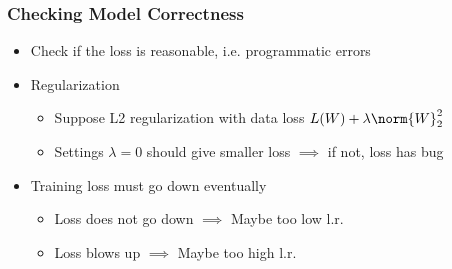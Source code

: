 \subsubsection*{Checking Model Correctness}
\begin{itemize}
    \item Check if the loss is reasonable, i.e. programmatic errors
    \item Regularization
    \begin{itemize}
        \item Suppose L2 regularization with data loss $L(W)+\lambda\norm{W}_2^2$
        \item Settings $\lambda=0$ should give smaller loss $\implies$ if not, loss has bug
    \end{itemize}
    \item Training loss must go down eventually
    \begin{itemize}
        \item Loss does not go down $\implies$ Maybe too low l.r.
        \item Loss blows up $\implies$ Maybe too high l.r.
    \end{itemize}
\end{itemize}
